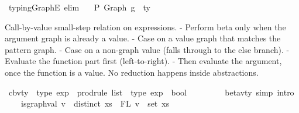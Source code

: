 \begin{isabellebody}
\isanewline
{}\isamarkupfalse%
\ typing{\isacharunderscore}{\kern0pt}GraphE\ {\isacharbrackleft}{\kern0pt}elim{\isacharbang}{\kern0pt}{\isacharbrackright}{\kern0pt}{\isacharcolon}{\kern0pt}\isanewline
\ \ {\isachardoublequoteopen}{\isasymGamma}\ {\isasymturnstile}{\isacharbraceleft}{\kern0pt}P{\isacharbraceright}{\kern0pt}\ {\isacharparenleft}{\kern0pt}Graph\ g{\isacharparenright}{\kern0pt}\ {\isacharcolon}{\kern0pt}\ ty{\isachardoublequoteclose}%
\isadelimdocument
%
\endisadelimdocument
%
\isatagdocument
%
\isamarkuptrue%
%
\endisatagdocument
{\isafolddocument}%
%
\isadelimdocument
%
\endisadelimdocument
%
\begin{isamarkuptext}%
Call-by-value small-step relation on expressions.
- Perform beta only when the argument graph is already a value.
- Case on a value graph that matches the pattern graph.
- Case on a non-graph value (falls through to the else branch).
- Evaluate the function part first (left-to-right).
- Then evaluate the argument, once the function is a value.
No reduction happens inside abstractions.%
\end{isamarkuptext}\isamarkuptrue%
\isamarkupfalse%
\ cbv{\isacharunderscore}{\kern0pt}ty\ {\isacharcolon}{\kern0pt}{\isacharcolon}{\kern0pt}\ {\isachardoublequoteopen}type\ exp\ {\isacharequal}{\kern0pt}{\isachargreater}{\kern0pt}\ prodrule\ list\ {\isacharequal}{\kern0pt}{\isachargreater}{\kern0pt}\ type\ exp\ {\isacharequal}{\kern0pt}{\isachargreater}{\kern0pt}\ bool{\isachardoublequoteclose}\isanewline
\ \ {\isacharparenleft}{\kern0pt}{\isachardoublequoteopen}{\isacharunderscore}{\kern0pt}\ {\isacharminus}{\kern0pt}{\isachargreater}{\kern0pt}{\isacharbraceleft}{\kern0pt}{\isacharunderscore}{\kern0pt}{\isacharbraceright}{\kern0pt}\ {\isacharunderscore}{\kern0pt}{\isachardoublequoteclose}\ {\isacharbrackleft}{\kern0pt}{}{}{\isacharcomma}{\kern0pt}{}{\isacharcomma}{\kern0pt}{}{}{\isacharbrackright}{\kern0pt}\ {}{}{\isacharparenright}{\kern0pt}\isanewline
{}\isanewline
\ \ beta{\isacharunderscore}{\kern0pt}v{\isacharunderscore}{\kern0pt}ty\ {\isacharbrackleft}{\kern0pt}simp{\isacharcomma}{\kern0pt}\ intro{\isacharbrackright}{\kern0pt}{\isacharcolon}{\kern0pt}\isanewline
\ \ \ \ {\isachardoublequoteopen}is{\isacharunderscore}{\kern0pt}graph{\isacharunderscore}{\kern0pt}val\ v\ {\isacharequal}{\kern0pt}{\isacharequal}{\kern0pt}{\isachargreater}{\kern0pt}\ distinct\ xs\ {\isacharequal}{\kern0pt}{\isacharequal}{\kern0pt}{\isachargreater}{\kern0pt}\ FL\ v\ {\isacharequal}{\kern0pt}\ set\ xs\ {\isacharequal}{\kern0pt}{\isacharequal}{\kern0pt}{\isachargreater}{\kern0pt}\isanewline

\end{isabellebody}
